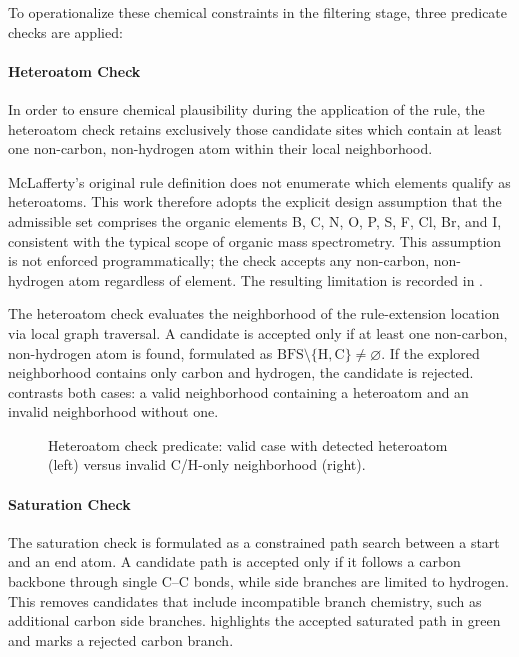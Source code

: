 To operationalize these chemical constraints in the filtering stage, three predicate checks are applied:

\paragraph{Heteroatom Check}
\label{par:heteroatom-check}
In order to ensure chemical plausibility during the application of the rule, the heteroatom check retains exclusively those candidate sites which contain at least one non-carbon, non-hydrogen atom within their local neighborhood.

McLafferty's original rule definition \cite[p.~57]{McLafferty1993} does not enumerate which elements qualify as heteroatoms. This work therefore adopts the explicit design assumption that the admissible set comprises the organic elements B, C, N, O, P, S, F, Cl, Br, and I, consistent with the typical scope of organic mass spectrometry. This assumption is not enforced programmatically; the check accepts any non-carbon, non-hydrogen atom regardless of element. The resulting limitation is recorded in .

The heteroatom check evaluates the neighborhood of the rule-extension location via local graph traversal.
A candidate is accepted only if at least one non-carbon, non-hydrogen atom is found, formulated as $\mathrm{BFS}\setminus\{\mathrm{H},\mathrm{C}\}\neq\varnothing$.
If the explored neighborhood contains only carbon and hydrogen, the candidate is rejected.
 contrasts both cases: a valid neighborhood containing a heteroatom and an invalid neighborhood without one.

\begin{figure}[H]
    \centering
    
    \caption[Heteroatom check predicate]{
        Heteroatom check predicate:
        valid case with detected heteroatom (left) versus invalid C/H-only neighborhood (right).
    }
    \label{fig:heteroatom-check}
\end{figure}

\paragraph{Saturation Check}
The saturation check is formulated as a constrained path search between a start and an end atom.
A candidate path is accepted only if it follows a carbon backbone through single C--C bonds, while side branches are limited to hydrogen.
This removes candidates that include incompatible branch chemistry, such as additional carbon side branches.
 highlights the accepted saturated path in green and marks a rejected carbon branch.

